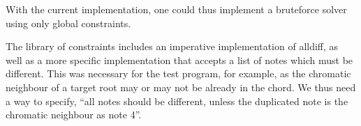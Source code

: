 \documentclass[letterpaper,10pt,english]{sphinxmanual}
\begin{document}
\sphinxAtStartPar
With the current implementation, one could thus implement a brute\sphinxhyphen{}force solver using only global constraints.

\sphinxAtStartPar
The library of constraints includes an imperative implementation of all\sphinxhyphen{}diff, as well
as a more specific implementation that accepts a list of notes which must be different.
This was necessary for the test program, for example, as the chromatic neighbour
of a target root may or may not be already in the chord. We thus need a way to specify,
“all notes should be different, unless the duplicated note is the chromatic neighbour as note 4”.

\begin{sphinxVerbatim}[commandchars=\\\{\}]


\end{sphinxVerbatim}
\end{document}
